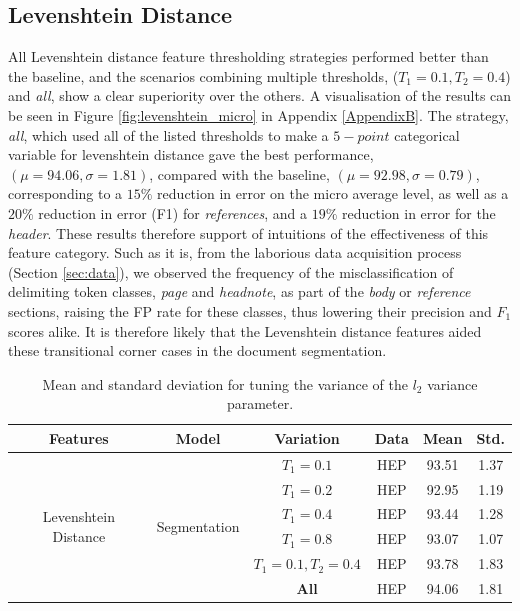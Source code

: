 \subsection{Levenshtein Distance}

All Levenshtein distance feature thresholding strategies performed better than the baseline, and the scenarios combining multiple thresholds, ($T_1 = 0.1, T_2 = 0.4$) and \emph{all}, show a clear superiority over the others. A visualisation of the results can be seen in Figure \ref{fig:levenshtein_micro} in Appendix \ref{AppendixB}. The strategy, \emph{all}, which used all of the listed thresholds to make a $5-point$ categorical variable for levenshtein distance gave the best performance, $(\mu = 94.06, \sigma = 1.81)$, compared with the baseline, $(\mu = 92.98, \sigma = 0.79)$, corresponding to a $15\%$ reduction in error on the micro average level, as well as a $20\%$ reduction in error (F1) for \emph{references}, and a $19\%$ reduction in error for the \emph{header}. These results therefore support of intuitions of the effectiveness of this feature category. Such as it is, from the laborious data acquisition process (Section \ref{sec:data}), we observed the frequency of the misclassification of delimiting token classes, \emph{page} and \emph{headnote}, as part of the \emph{body} or \emph{reference} sections, raising the FP rate for these classes, thus lowering their precision and $F_1$ scores alike. It is therefore likely that the Levenshtein distance features aided these transitional corner cases in the document segmentation.

\begin{table}[h]
\begin{center}
\begin{tabular}{|c|c|c|c|c|c|}
\hline
Features & Model & Variation & Data & Mean & Std.\\
\hline
\multirow{6}{*}{Levenshtein Distance} & \multirow{6}{*}{Segmentation} & $T_1 = 0.1$ & HEP & 93.51 & 1.37\\\cline{3-6}
& & $T_1 = 0.2$ & HEP & 92.95 & 1.19\\\cline{3-6}
& & $T_1 = 0.4$ & HEP & 93.44 & 1.28\\\cline{3-6}
& & $T_1 = 0.8$ & HEP & 93.07 & 1.07\\\cline{3-6}
& & $T_1 = 0.1, T_2 = 0.4$ & HEP & 93.78 & 1.83\\\cline{3-6}
& & \textbf{All} & HEP & 94.06 & 1.81\\\cline{3-6}
\hline
\end{tabular}
\caption[Mean and standard deviation for tuning the variance of the $l_2$ variance parameter.]{Mean and standard deviation for tuning the variance of the $l_2$ variance parameter.}
\label{table:levenshteinresults}
\end{center}
\end{table}

